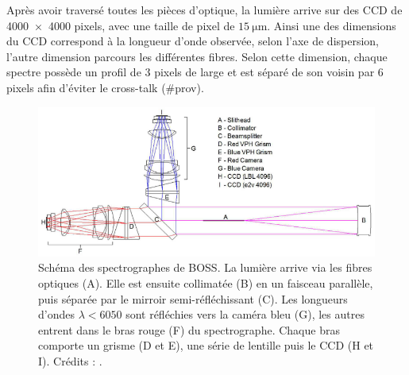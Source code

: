 \documentclass[11pt, twoside, a4paper, openright]{report}
\begin{document}
Après avoir traversé toutes les pièces d'optique, la lumière arrive sur des CCD de \num{4000x4000} pixels, avec une taille de pixel de $\SI{15}{\micro\meter}$. Ainsi une des dimensions du CCD correspond à la longueur d'onde observée, selon l'axe de dispersion, l'autre dimension parcours les différentes fibres. Selon cette dimension, chaque spectre possède un profil de 3 pixels de large et  est séparé de son voisin par 6 pixels afin d'éviter le cross-talk (\#prov).
\begin{figure}
  \centering
  \includegraphics[scale=0.5]{SchemaSpectro}
  \caption{Schéma des spectrographes de BOSS. La lumière arrive via les fibres optiques (A). Elle est ensuite collimatée (B) en un faisceau parallèle, puis séparée par le mirroir semi-réfléchissant (C). Les longueurs d'ondes $\lambda < \num{6050}$ sont réfléchies vers la caméra bleu (G), les autres entrent dans le bras rouge (F) du spectrographe. Chaque bras comporte un grisme (D et E), une série de lentille puis le CCD (H et I). Crédits : \textcite{Smee2012}.}
  \label{fig:SchemaSpectro}
\end{figure}
\end{document}
